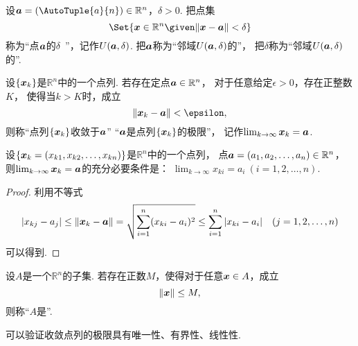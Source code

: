 \begin{definition}
设\(\vb{a}=(\AutoTuple{a}{n})\in\mathbb{R}^n\)，\(\delta>0\).
把点集\[
	\Set{ \vb{x}\in\mathbb{R}^n \given \norm{\vb{x}-\vb{a}}<\delta }
\]称为“点\(\boldsymbol{a}\)的\(\delta\)~”，记作\(U(\boldsymbol{a},\delta)\).
把\(\boldsymbol{a}\)称为“邻域\(U(\boldsymbol{a},\delta)\)的”，
把\(\delta\)称为“邻域\(U(\boldsymbol{a},\delta)\)的”.
\end{definition}
\begin{definition}
设\(\{\boldsymbol{x}_k\}\)是\(\mathbb{R}^n\)中的一个点列.
若存在定点\(\boldsymbol{a}\in\mathbb{R}^n\)，
对于任意给定\(\epsilon>0\)，存在正整数\(K\)，
使得当\(k>K\)时，成立\[
	\norm{\vb{x}_k-\vb{a}}<\epsilon,
\]
则称“点列\(\{\boldsymbol{x}_k\}\)收敛于\(\boldsymbol{a}\)”
“\(\boldsymbol{a}\)是点列\(\{\boldsymbol{x}_k\}\)的极限”，
记作\(\lim_{k\to\infty} \boldsymbol{x}_k = \boldsymbol{a}\).
\end{definition}
\begin{theorem}
设\(\{\boldsymbol{x}_k=(x_{k1},x_{k2},\dotsc,x_{kn})\}\)是\(\mathbb{R}^n\)中的一个点列，
点\(\boldsymbol{a}=(a_1,a_2,\dotsc,a_n)\in\mathbb{R}^n\)，
则\(\lim_{k\to\infty} \boldsymbol{x}_k = \boldsymbol{a}\)的充分必要条件是：
\(\lim_{k\to\infty} x_{ki} = a_i\ (i=1,2,\dotsc,n)\).
\begin{proof}
利用不等式\[
	\abs{x_{kj}-a_j}
	\leq \norm{\boldsymbol{x}_k-\boldsymbol{a}}
	= \sqrt{\sum_{i=1}^n (x_{ki}-a_i)^2}
	\leq \sum_{i=1}^n \abs{x_{ki}-a_i}
	\quad(j=1,2,\dotsc,n)
\]可以得到.
\end{proof}
\end{theorem}

\begin{definition}
设\(A\)是一个\(\mathbb{R}^n\)的子集.
若存在正数\(M\)，使得对于任意\(\boldsymbol{x} \in A\)，成立\[
	\norm{\boldsymbol{x}} \leq M,
\]
则称“\(A\)是”.
\end{definition}
可以验证收敛点列的极限具有唯一性、有界性、线性性.

